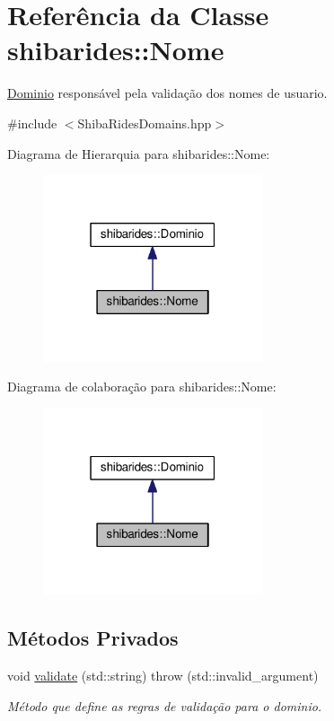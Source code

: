 \hypertarget{classshibarides_1_1Nome}{}\section{Referência da Classe shibarides\+:\+:Nome}
\label{classshibarides_1_1Nome}


\hyperlink{classshibarides_1_1Dominio}{Dominio} responsável pela validação dos nomes de usuario.  




{\ttfamily \#include $<$Shiba\+Rides\+Domains.\+hpp$>$}



Diagrama de Hierarquia para shibarides\+:\+:Nome\+:\nopagebreak
\begin{figure}[H]
\begin{center}
\leavevmode
\includegraphics[width=183pt]{classshibarides_1_1Nome__inherit__graph}
\end{center}
\end{figure}


Diagrama de colaboração para shibarides\+:\+:Nome\+:\nopagebreak
\begin{figure}[H]
\begin{center}
\leavevmode
\includegraphics[width=183pt]{classshibarides_1_1Nome__coll__graph}
\end{center}
\end{figure}
\subsection*{Métodos Privados}
\begin{DoxyCompactItemize}
\item 
void \hyperlink{classshibarides_1_1Nome_aae6c1656422424a675e79a03a7ca534e}{validate} (std\+::string)  throw (std\+::invalid\+\_\+argument)
\begin{DoxyCompactList}\small\item\em Método que define as regras de validação para o dominio. \end{DoxyCompactList}\end{DoxyCompactItemize}
